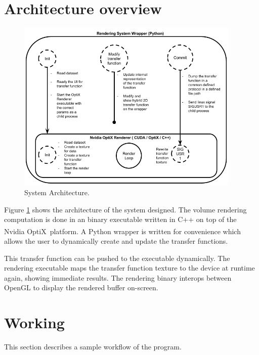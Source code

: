 \documentclass[letterpaper,11pt]{report}
\def\optix{Nvidia\textsuperscript{\textregistered} OptiX\texttrademark\ }
\begin{document}
\section{Architecture overview}

\begin{figure}[h!]
 \centering
  \includegraphics[width=0.95\textwidth]{arch1.png}
  \caption{System Architecture.}
  \label{fig:arch1}
 \end{figure}

Figure \ref{fig:arch1} shows the architecture of the system designed. The volume rendering computation is done in an binary executable written in C++ on top of the \optix platform. A Python wrapper is written for convenience which allows the user to dynamically create and update the transfer functions.\

This transfer function can be pushed to the executable dynamically. The rendering executable maps the transfer function texture to the device at runtime again, showing immediate results. The rendering binary interops between OpenGL to display the rendered buffer on-screen.

\section{Working}
This section describes a sample workflow of the program.
\end{document}
